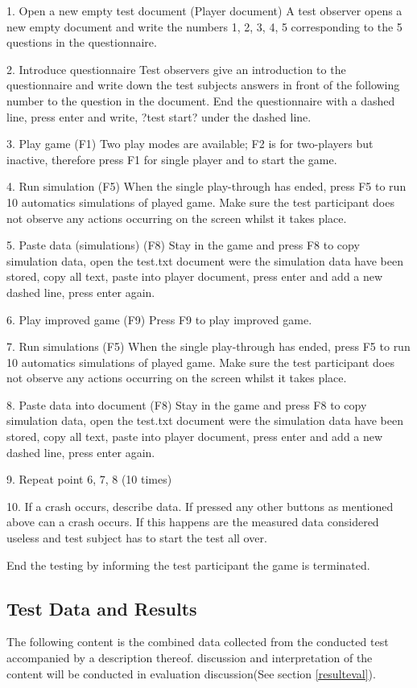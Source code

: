 1.	Open a new empty test document (Player document)
A test observer opens a new empty document and write the numbers 1, 2, 3, 4, 5 corresponding to the 5 questions in the questionnaire.

2.	Introduce questionnaire
Test observers give an introduction to the questionnaire and write down the test subjects answers in front of the following number to the question in the document. 
End the questionnaire with a dashed line, press enter and write, ?test start? under the dashed line.

3.	Play game (F1)
Two play modes are available; F2 is for two-players but inactive, therefore press F1 for single player and to start the game.

4.	Run simulation (F5)
When the single play-through has ended, press F5 to run 10 automatics simulations of played game. Make sure the test participant does not observe any actions occurring on the screen whilst it takes place. 

5.	Paste data (simulations) (F8)
Stay in the game and press F8 to copy simulation data, open the test.txt document were the simulation data have been stored, copy all text, paste into player document, press enter and add a new dashed line, press enter again. 

6.	Play improved game (F9)
Press F9 to play improved game. 

7.	Run simulations (F5)
When the single play-through has ended, press F5 to run 10 automatics simulations of played game. Make sure the test participant does not observe any actions occurring on the screen whilst it takes place.

8.	Paste data into document (F8)
Stay in the game and press F8 to copy simulation data, open the test.txt document were the simulation data have been stored, copy all text, paste into player document, press enter and add a new dashed line, press enter again. 

9.	Repeat point 6, 7, 8 (10 times)

10.	If a crash occurs, describe data.
If pressed any other buttons as mentioned above can a crash occurs. If this happens are the measured data considered useless and test subject has to start the test all over.

End the testing by informing the test participant the game is terminated.



\newpage
\subsection{Test Data and Results}
The following content is the combined data collected from the conducted test accompanied by a description thereof. discussion and interpretation of the content will be conducted in evaluation discussion(See section \ref{resulteval}).

